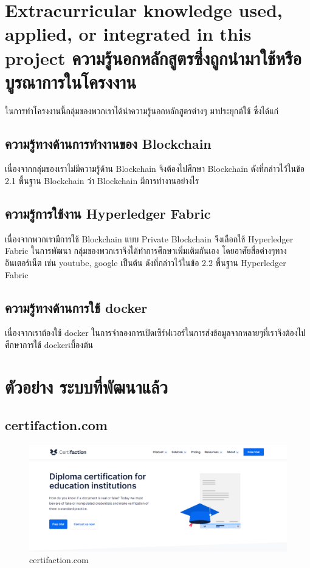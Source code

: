 
\section{\ifenglish%
Extracurricular knowledge used, applied, or integrated in this project
\else%
ความรู้นอกหลักสูตรซึ่งถูกนำมาใช้หรือบูรณาการในโครงงาน
\fi
}
\enskip \enskip \enskip \enskip \enskip ในการทำโครงงานนี้กลุ่มของพวกเราได้นำความรู้นอกหลักสูตรต่างๆ มาประยุกต์ใช้ ซึ่งได้แก่

\subsection{ความรู้ทางด้านการทำงานของ Blockchain}
\enskip \enskip \enskip เนื่องจากกลุ่มของเราไม่มีความรู้ด้าน Blockchain จึงต้องไปศึกษา Blockchain ดังที่กล่าวไว้ในข้อ 2.1 พื้นฐาน Blockchain ว่า Blockchain มีการทำงานอย่างไร

\subsection{ความรู้การใช้งาน Hyperledger Fabric}
\enskip \enskip \enskip เนื่องจากพวกเรามีการใช้ Blockchain แบบ Private Blockchain จึงเลือกใช้ Hyperledger Fabric  ในการพัฒนา กลุ่มของพวกเราจึงได้ทำการศึกษาเพิ่มเติมกันเอง
โดยอาศัยสื่อต่างๆทางอินเตอร์เน็ต เช่น youtube, google เป็นต้น ดังที่กล่าวไว้ในข้อ 2.2 พื้นฐาน Hyperledger Fabric


\subsection{ความรู้ทางด้านการใช้ docker}
\enskip \enskip \enskip เนื่องจากเราต้องใช้ docker ในการจำลองการเปิดเซิร์ฟเวอร์ในการส่งข้อมูลจากหลายๆที่เราจึงต้องไปศึกษาการใช้ dockerเบื้องต้น

\section{ตัวอย่าง ระบบที่พัฒนาแล้ว}
\enskip \enskip \enskip \enskip \enskip

\subsection{certifaction.com~\cite{certifaction}}

\enskip \enskip \enskip 
\graphicspath{ {./images/} }
\begin{figure}[htbp]
  \centering 
  \includegraphics[scale=0.3]{certifi_1.png}
  \caption[certifaction.com]{certifaction.com}
  \label{certifi_1}
\end{figure}


